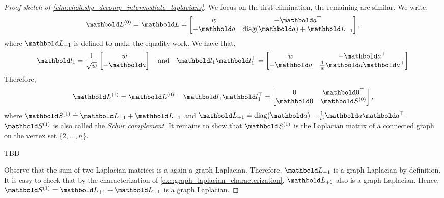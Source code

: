 \begin{proof}[Proof sketch of \cref{clm:cholesky_decomp_intermediate_laplacians}] We focus on the first elimination, the remaining are similar. We write, \begin{align*}
    \mL^{(0)} = \mL \eqdef \begin{bmatrix}
        w & -\trans{\va} \\
        -\va & \diag(\va) + \mL_{-1} \\
    \end{bmatrix},
\end{align*} where $\mL_{-1}$ is defined to make the equality work. We have that, \begin{align*}
    \vl_1 = \frac{1}{\sqrt{w}}\begin{bmatrix}
        w \\
        -\va \\
    \end{bmatrix} \quad\text{and}\quad \vl_1 \trans{\vl_1} = \begin{bmatrix}
        w & -\trans{\va} \\
        -\va & \frac{1}{w}\va\trans{\va} \\
    \end{bmatrix}
\end{align*} Therefore, \begin{align*}
    \mL^{(1)} = \mL^{(0)} - \vl_1 \trans{\vl_1} = \begin{bmatrix}
        0 & \trans{\vZero} \\
        \vZero & \mS^{(0)} \\
    \end{bmatrix},
\end{align*} where $\mS^{(1)} \defeq \mL_{+1} + \mL_{-1}$ and $\mL_{+1} \defeq \diag(\va) - \frac{1}{w}\va\trans{\va}$. $\mS^{(1)}$ is also called the \emph{Schur complement}. It remains to show that $\mS^{(1)}$ is the Laplacian matrix of a connected graph on the vertex set $\{2, \dots, n\}$.

\begin{marginfigure}
TBD
\caption{$\mS^{(1)}$ is the Laplacian matrix of the graph, where the first vertex was removed and all of its neighbors are made to be in a clique.}
\end{marginfigure}

Observe that the sum of two Laplacian matrices is a again a graph Laplacian. Therefore, $\mL_{-1}$ is a graph Laplacian by definition. It is easy to check that by the characterization of \cref{exc:graph_laplacian_characterization}, $\mL_{+1}$ also is a graph Laplacian. Hence, $\mS^{(1)} = \mL_{+1} + \mL_{-1}$ is a graph Laplacian.


\end{proof}
